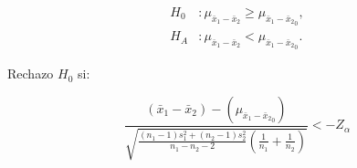 		\begin{minipage}[b]{\textwidth}
    \begin{minipage}[c]{0.3 \textwidth}\item
    	\begin{align*}
    	H_0&: \mu _{ \bar { x } _{ 1 }-\bar { x } _{ 2 }} \ge \mu _{ \bar { x } _{ 1 }-\bar { x } _{ 2 }}_0,\\
    	H_A&: \mu _{ \bar { x } _{ 1 }-\bar { x } _{ 2 }} < \mu _{ \bar { x } _{ 1 }-\bar { x } _{ 2 }}_0.    	
    	\end{align*}\end{minipage} \hfill
    \begin{minipage}[c]{0.3 \textwidth}\item
				Rechazo $H_0$ si:		
		\end{minipage} \hfill
    \begin{minipage}[c]{0.3 \textwidth}\item
	 $$\frac { (\bar { x } _{ 1 }-\bar { x } _{ 2 })-(\mu _{ \bar { x } _{ 1 }-\bar { x } _{ 2 } }_{ 0 }) }{ \sqrt { \frac { (n_{ 1 }-1)s^{ 2 }_{ 1 }+(n_{ 2 }-1)s^{ 2 }_{ 2 } }{ n_{ 1 }-n_{ 2 }-2 }   \left( \frac { 1 }{ n_{ 1 } } +\frac { 1 }{ n_{ 2 } }  \right)  } }< -Z_{\alpha}$$
    \end{minipage}
    \end{minipage}
